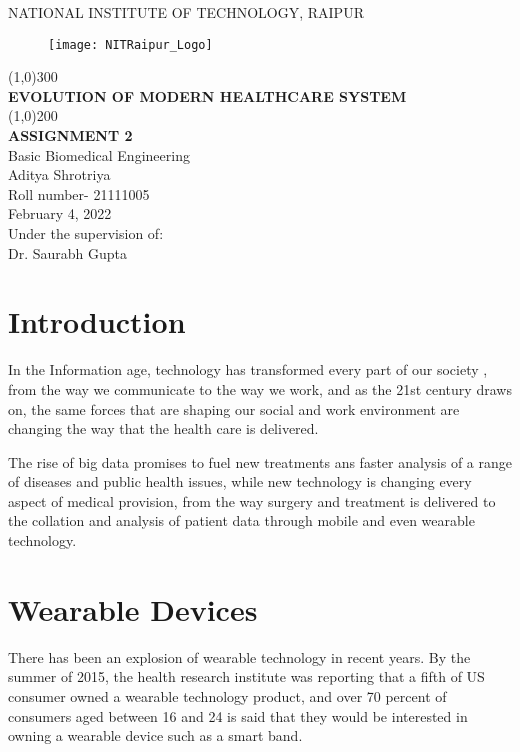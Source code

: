 \documentclass[12pt]{article}
\begin{document}
\begin{titlepage}
\begin{center}

\large{NATIONAL INSTITUTE OF TECHNOLOGY, RAIPUR}\\
[1.5mm]
\begin{figure}[h]
\centering
\texttt{[image: NITRaipur\_Logo]}
\end{figure}
\line(1,0){300}\\
[0.25in]
\huge{\bfseries EVOLUTION OF MODERN HEALTHCARE SYSTEM}\\
[2mm]
\line(1,0){200}\\
[0.25in]
\large{\bfseries ASSIGNMENT 2}\\
{Basic Biomedical Engineering}\\
[0.75cm]
\large{Aditya Shrotriya}\\
{Roll number- 21111005}\\
{February 4, 2022}\\
[1cm]
\large{Under the supervision of:}\\
{Dr. Saurabh Gupta}

\end{center}
\end{titlepage}
\clearpage
\tableofcontents
\clearpage

\section{Introduction}

In the Information age, technology has transformed every part of our society , from the way we communicate to the way we work, and as the 21st century draws on, the same forces that are shaping our social and work environment are changing the way that the health care is delivered.

The rise of big data promises to fuel new treatments ans faster analysis of a range of diseases and public health issues, while new technology is changing every aspect of medical provision, from the way surgery and treatment is delivered to the collation and analysis of patient data through mobile and even wearable technology.  

\section{Wearable Devices}

There has been an explosion of wearable technology in recent years. By the summer of 2015, the health research institute was reporting that a fifth of US consumer owned a wearable technology product, and over 70 percent of consumers aged between 16 and 24 is said that they would be interested in owning a wearable device such as a smart band.
\end{document}
